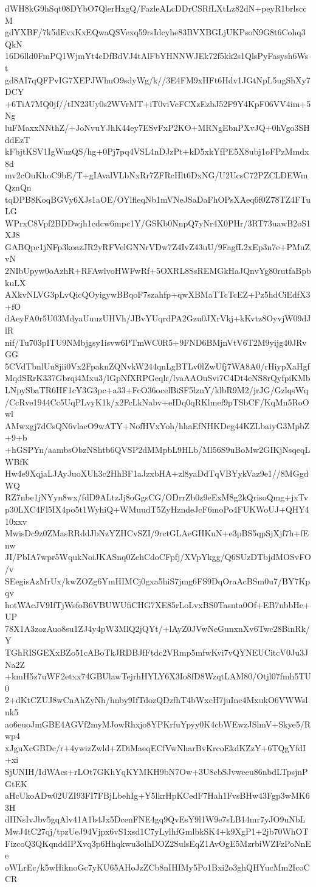 dWH8kG9hSqt08DYbO7QlerHxgQ/FazleALcDDrCSRfLXtLz82dN+peyR1brlsccM
gdYXBF/7k5dEvxKxEQwaQSVexq59rsIdcyhe83BVXBGLjUKPsoN9G8t6Cohq3QkN
16D6lld0FmPQ1WjmYt4cDfBdVJ4tAlFbYHNNWJEk72f5kk2s1QlsPyFasysh6Wst
gd8AI7qQFPvIG7XEPJWhuO9sdyWg/k//3E4FM9xHFt6Hdv1JGtNpL5ugShXy7DCY
+6TiA7MQ0jf//tIN23Uy0s2WVrMT+iT0viVcFCXzEzbJ52F9Y4KpF06VV4im+5Ng
luFMaxxNNthZ/+JoNvuYJhK44ey7ESvFxP2KO+MRNgEbnPXvJQ+0hVgo3SHddEzT
kFbjtKSV1IgWuzQS/hg+0Pj7pq4VSL4nDJzPt+kD5xkYfPE5X8ubj1oFPzMmdx8d
mv2cOuKhoC9bE/T+gIAvalVLbNxRr7ZFRcHlt6DxNG/U2UcsC72PZCLDEWmQznQn
tqDPB8KoqBGVy6XJs1aOE/OYlfleqNb1mVNeJSaDaFhOPsXAeq6f0Z78TZ4FTuLG
WPrxC8Vpf2BDDwjh1cdcw6mpc1Y/GSKb0NnpQ7yNr4X0PHr/3RT73uawB2oS1XJ8
GABQpc1jNFp3koazJR2yRFVelGNNrVDw7Z4IvZ43uU/9FagfL2xEp3n7e+PMuZvN
2NIbUpyw0oAzhR+RFAwlvoHWFwRf+5OXRL8SsREMGkHaJQnvYg80rutfaBpbkuLX
AXkvNLVG3pLvQicQOyigywBBqoF7szahfp+qwXBMaTTcTcEZ+Pz5hdCiEdfX3+fO
dAeyFA0r5U03MdyaUuuzUHVh/JBvYUqrdPA2Gzu0JXrVkj+kKvtz8OyvjW09dJlR
nif/Tu703pITU9NMbjgsy1isvw6PTmWC0R5+9FND6BMjnVtV6T2M9yijg40JRvGG
5CVdTbnlUu8jii0Vx2FpaknZQNvkW244qnLgBTLv0lZwUfj7WA8A0/rHiypXaHgf
MqdSRrK337Gbrqi4Mxu3/lGpNfXRPGeqlr/lvaAAOuSvi7C4Dt4eNS8rQyfpiKMb
LNpySbaTR6HF1cY3G3pc+a33+FcO36ocelBiSF5lznY/klbR9M2/jrJG/GzlqsWq
/CcRve1944Cc5UqPLvyK1k/x2FcLkNabv+eIDq0qRKlmef9pTSbCF/KqMn5RoOwl
AMwxgj7dCsQN6vlacO9wATY+NofHVxYoh/hhaEfNHKDeg44KZLbaiyG3MpbZ+9+b
+hGSPYn/aambsObzNShtb6QVSP2dMMpbL9HLb/Ml56S9uBoMw2GIKjNsqeqLWBfK
Hw4e9XqjaLJAyJuoXUh3c2HhBF1aJzxbHA+zl8yaDdTqVBYykVaz9e1//8MGgdWQ
RZ7nbe1jNYyn8wx/fdD9ALtzJj8oGgsCG/ODrrZb0z9eExM8g2kQrisoQmg+jxTv
p30LXC4Fl5IX4po5t1WyhiQ+WMuudT5ZyHzndeJcF6moPo4FUKWoUJ+QHY410xxv
MwisDc9z0ZMasRRddJbNzYZHCvSZI/9rctGLAeGHKuN+e3pBS5qpSjXjf7h+fEnw
JI/PbIA7wpr5WqukNoiJKASnq0ZehCdoCFpfj/XVpYkgg/Q6SUzDTbjdMOSvFO/v
SEegisAzMrUx/kwZOZg6YmHIMCj0gxa5hiS7jmg6FS9DqOraAcBSm0u7/BY7Kpqv
hotWAcJV9IfTjWsfoB6VBUWUfiCHG7XE85rLoLvxBS0Tasnta0Of+EB7nbbHe+UP
78X1A3zozAuo8su1ZJ4y4pW3MlQ2jQYt/+lAyZ0JVwNeGunxnXv6Twc28BinRk/Y
TGhRISGEXxBZo51cABoTkJRDBJfFtdc2VRmp5mfwKvi7vQYNEUCitcV0Ju3JNa2Z
+kmH5z7uWF2etxx74GBUlawTejrhHYLY6X3Io8fD8WzqtLAM80/Otjl07fmh5TU0
2+dKtCZUJ8wCnAhZyNh/hnby9IfTdozQDzfhT4bWxcH7juInc4MxukO6VWWslnk5
ao6euoJmGBE4AGVf2myMJowRhxjo8YPKrfuYpyy0K4cbWEwzJSlmV+Skye5/Rwp4
xJguXcGBDc/r+4ywizZwld+ZDiMaeqECfVwNharBvKrcoEkdKZzY+6TQgYfdI+xi
SjUNIH/IdWAcs+rLOt7GKhYqKYMKH9bN7Ow+3U8cbSJvweeu86nbdLTpsjnPGtEK
aHcUkoADw02UZI93FI7FBjLbehIg+Y5lkrHpKCedF7Hah1FvsBHw43Fgp3wMK63H
dIINsIvJbv5gqAlv41A1b4Jx5DcenFNE4gq9QvEsY9l1W9e7sLB14mr7yJO9uNbL
MwJ4tC27qj/tpzUeJ94Vjpx6vS1xsd1C7yLylhfGmlbkSK4+k9XgP1+2jb70WhOT
FizcoQ3QKqnddIPXvq3p6Hhqkwu3olhDOZ2SulsEqZ1AvOgE5MzrbiWZFzPoNnEe
oWLrEc/k5wHiknoGc7yKU65AHoJzZCb8nIHIMy5Po1Bxi2o3ghQHYucMm2IcoCCR
